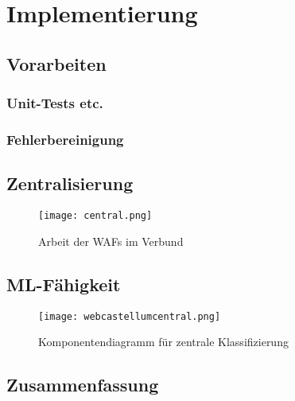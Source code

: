 \chapter{Implementierung}



\section{Vorarbeiten}

  
\subsection{Unit-Tests etc.}
\subsection{Fehlerbereinigung}

\section{Zentralisierung}
\begin{figure}[ht]
    \centering
    \texttt{[image: central.png]}
    \caption{Arbeit der WAFs im Verbund}
    \label{fig:my_verbund}
\end{figure}



\section{ML-Fähigkeit}

\begin{figure}[h]
    \centering
    \texttt{[image: webcastellumcentral.png]}
    \caption{Komponentendiagramm für zentrale Klassifizierung}
    \label{fig:my_future}
\end{figure}



\section{Zusammenfassung}



